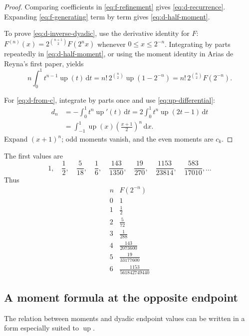 \documentclass[11pt]{article}
\numberwithin{equation}{section}
\theoremstyle{definition}
\theoremstyle{remark}
\newcommand{\upf}{\operatorname{up}}
\newcommand{\dd}{\,\mathrm d}
\begin{document}
\begin{proof}
Comparing coefficients in \eqref{eq:f-refinement} gives \eqref{eq:d-recurrence}.  Expanding \eqref{eq:f-generating} term by term gives \eqref{eq:d-half-moment}.

To prove \eqref{eq:d-inverse-dyadic}, use the derivative identity for $F$:
$F^{(n)}(x)=2^{\binom{n+1}{2}}F(2^nx)$ whenever $0\le x\le2^{-n}$.  Integrating by parts repeatedly in \eqref{eq:d-half-moment}, or using the moment identity in Arias de Reyna's first paper, yields
\[
 n\int_0^1t^{n-1}\upf(t)\dd t
 =n!\,2^{\binom n2}\upf(1-2^{-n})
 =n!\,2^{\binom n2}F(2^{-n}).
\]

For \eqref{eq:d-from-c}, integrate by parts once and use \eqref{eq:up-differential}:
\begin{align*}
 d_n
 &= -\int_0^1t^n\upf'(t)\dd t
 =2\int_0^1t^n\upf(2t-1)\dd t\\
 &=\int_{-1}^{1}\upf(x)\left(\frac{x+1}{2}\right)^n\dd x.
\end{align*}
Expand $(x+1)^n$; odd moments vanish, and the even moments are $c_k$.
\end{proof}

The first values are
\begin{equation}\label{eq:d-values}
 1,\quad \frac12,\quad \frac5{18},\quad \frac16,\quad
 \frac{143}{1350},\quad \frac{19}{270},\quad
 \frac{1153}{23814},\quad \frac{583}{17010},\ldots
\end{equation}
Thus
\begin{equation}\label{eq:inverse-dyadic-table-small}
\begin{array}{c|c}
 n&F(2^{-n})\\ \hline
 0&1\\
 1&\frac12\\
 2&\frac5{72}\\
 3&\frac1{288}\\
 4&\frac{143}{2073600}\\
 5&\frac{19}{33177600}\\
 6&\frac{1153}{561842749440}
\end{array}
\end{equation}

\subsection{A moment formula at the opposite endpoint}

The relation between moments and dyadic endpoint values can be written in a form especially suited to $\upf$.
\end{document}
